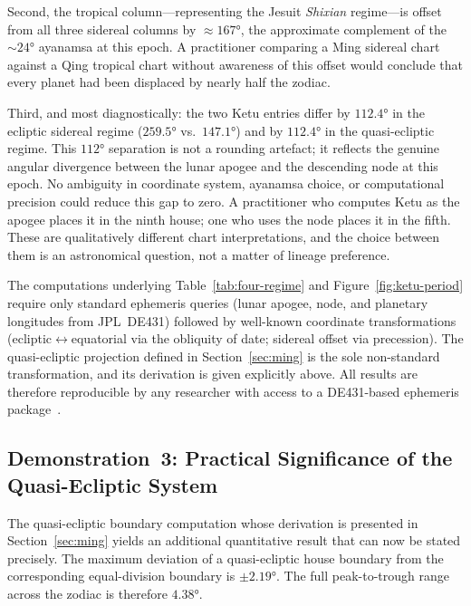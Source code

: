 \documentclass[10pt,a4paper]{article}
\providecommand{\degree}{\ensuremath{°}}
\begin{document}
Second, the tropical column---representing the Jesuit \textit{Shixian} regime---is
offset from all three sidereal columns by $\approx 167\degree$, the approximate
complement of the~$\sim 24\degree$ ayanamsa at this epoch.  A practitioner
comparing a Ming sidereal chart against a Qing tropical chart without awareness
of this offset would conclude that every planet had been displaced by nearly half
the zodiac.

Third, and most diagnostically: the two Ketu entries differ by $112.4\degree$
in the ecliptic sidereal regime ($259.5\degree$ vs.\ $147.1\degree$) and by
$112.4\degree$ in the quasi-ecliptic regime.  This $112\degree$ separation is not
a rounding artefact; it reflects the genuine angular divergence between the lunar
apogee and the descending node at this epoch.  No ambiguity in coordinate system,
ayanamsa choice, or computational precision could reduce this gap to zero.  A
practitioner who computes Ketu as the apogee places it in the ninth house;
one who uses the node places it in the fifth.  These are qualitatively different
chart interpretations, and the choice between them is an astronomical question,
not a matter of lineage preference.

The computations underlying Table~\ref{tab:four-regime} and
Figure~\ref{fig:ketu-period} require only standard ephemeris queries (lunar
apogee, node, and planetary longitudes from JPL~DE431) followed by well-known
coordinate transformations (ecliptic$\leftrightarrow$equatorial via the
obliquity of date; sidereal offset via precession).  The quasi-ecliptic
projection defined in Section~\ref{sec:ming} is the sole non-standard
transformation, and its derivation is given explicitly above.  All results
are therefore reproducible by any researcher with access to a DE431-based
ephemeris package~\cite{mak2014pseudoplanets,niu1995ketu}.

\subsection*{Demonstration~3: Practical Significance of the Quasi-Ecliptic System}

The quasi-ecliptic boundary computation whose derivation is presented in
Section~\ref{sec:ming} yields an additional quantitative result that can now be
stated precisely.  The maximum deviation of a quasi-ecliptic house boundary from
the corresponding equal-division boundary is $\pm 2.19\degree$.  The full
peak-to-trough range across the zodiac is therefore $4.38\degree$.
\end{document}

